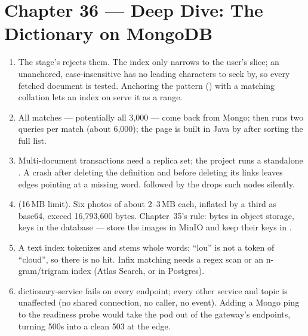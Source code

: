 \section*{Chapter 36 --- Deep Dive: The Dictionary on MongoDB}
\begin{enumerate}
  \item The  stage's  rejects them. The
   index only narrows to the user's slice; an
  unanchored, case-insensitive  has no leading characters
  to seek by, so every fetched document is tested. Anchoring the pattern
  () with a matching collation lets an index on
   serve it as a range.
  \item All matches --- potentially all 3{,}000 --- come back from
  Mongo;  then runs two  queries per
  match (about 6{,}000); the page is built in Java by 
  after sorting the full list.
  \item Multi-document transactions need a replica set; the project
  runs a standalone . A crash after deleting the definition
  and before deleting its links leaves edges pointing at a missing word.
   followed by the
   drops such nodes silently.
  \item {} (16\,MB limit). Six
  photos of about 2--3\,MB each, inflated by a third as base64, exceed
  16{,}793{,}600 bytes. Chapter~35's rule: bytes in object storage,
  keys in the database --- store the images in MinIO and keep their
  keys in .
  \item A text index tokenizes and stems whole words; ``lou'' is not a
  token of ``cloud'', so there is no hit. Infix matching needs a regex
  scan or an n-gram/trigram index (Atlas Search, or  in
  Postgres).
  \item dictionary-service fails on every endpoint; every other service
  and topic is unaffected (no shared connection, no caller, no event).
  Adding a Mongo ping to the readiness probe would take the pod out of
  the gateway's endpoints, turning 500s into a clean 503 at the edge.
\end{enumerate}


